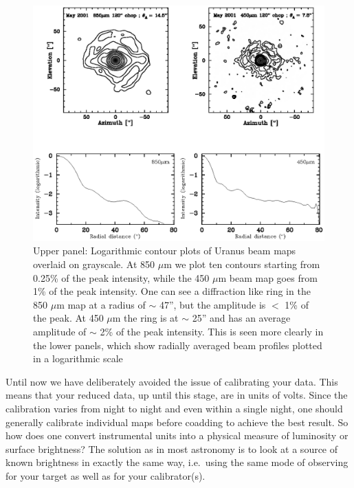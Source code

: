 \documentclass[twoside,11pt]{article}
\renewcommand{\_}{\texttt{\symbol{95}}}
\begin{document}
\begin{figure}
\begin{center}
\includegraphics[width=\textwidth]{sc11_fig11.eps}
\caption{Upper panel: Logarithmic contour plots of Uranus beam maps
overlaid on grayscale.  At 850 $\mu$m we plot ten contours starting
from 0.25\% of the peak intensity, while the 450 $\mu$m beam map goes
from 1\% of the peak intensity.  One can see a diffraction like ring
in the 850 $\mu$m map at a radius of $\sim$ 47'', but the amplitude is
$<$ 1\% of the peak.  At 450 $\mu$m the ring is at $\sim$ 25'' and has
an average amplitude of $\sim$ 2\% of the peak intensity.  This is
seen more clearly in the lower panels, which show radially averaged
beam profiles plotted in a logarithmic scale}

\label{fig:beams}
\end{center}
\end{figure}



Until now we have deliberately avoided the issue of calibrating your
data. This means that your reduced data, up until this stage, are in
units of volts. Since the calibration varies from night to night and
even within a single night, one should generally calibrate individual
maps before coadding to achieve the best result. So how does one
convert instrumental units into a physical measure of luminosity or
surface brightness? The solution as in most astronomy is to look at a
source of known brightness in exactly the same way, i.e.\ using the
same mode of observing for your target as well as for your
calibrator(s).
\end{document}
